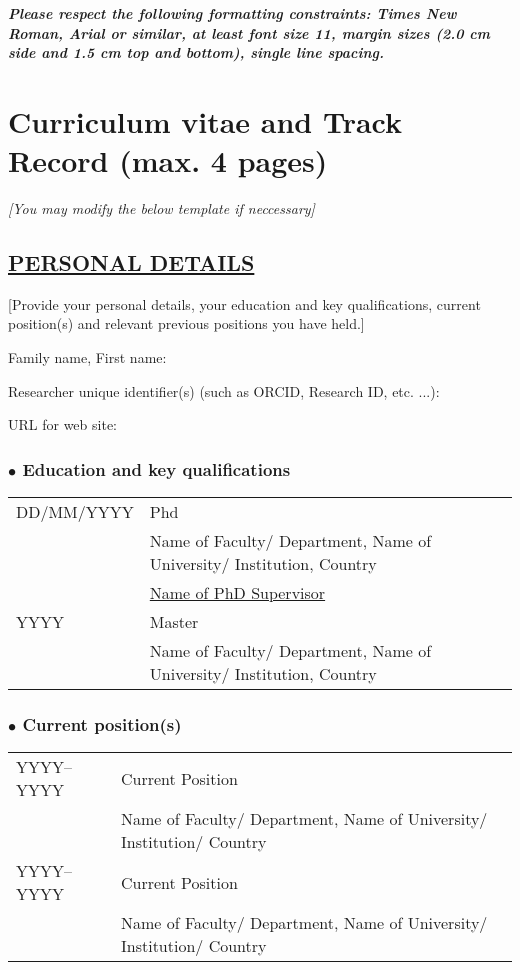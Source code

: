\documentclass[b1]{erc} %
\begin{document}
\textit{\textbf{Please respect the following formatting constraints: Times New Roman, Arial or similar, at least font size 11, margin sizes (2.0 cm side and 1.5 cm top and bottom), single line spacing.}}

\newpage

\section{Curriculum vitae and Track Record (max. 4 pages)}

\textit{[You may modify the below template if neccessary]}

\subsection*{\underline{PERSONAL DETAILS}}

[Provide your personal details, your education and key qualifications, current position(s) and relevant previous positions you have held.]


\noindent Family name, First name:

\noindent Researcher unique identifier(s) (such as ORCID, Research ID, etc. ...):

\noindent URL for web site: 		

\subsubsection*{$\bullet$ Education and key qualifications}

\begin{tabular}{m{8em} m{32em}}
     DD/MM/YYYY & Phd \\
                & Name of Faculty/ Department, Name of University/ Institution, Country \\
		& \underline{Name of PhD Supervisor} \\
     YYYY       & Master \\
                & Name of Faculty/ Department, Name of University/ Institution, Country \\
\end{tabular}

\subsubsection*{$\bullet$ Current position(s)}

\begin{tabular}{m{8em} m{32em}}
     YYYY--YYYY	& Current Position \\
                & Name of Faculty/ Department, Name of University/ Institution/ Country \\
     YYYY--YYYY	& Current Position \\
                & Name of Faculty/ Department, Name of University/ Institution/ Country \\
\end{tabular}
\end{document}
